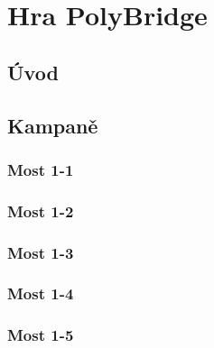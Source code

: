 \chapter{Hra PolyBridge}

\section{Úvod}
\section{Kampaně}
\subsection{Most 1-1}
\subsection{Most 1-2}
\subsection{Most 1-3}
\subsection{Most 1-4}
\subsection{Most 1-5}
